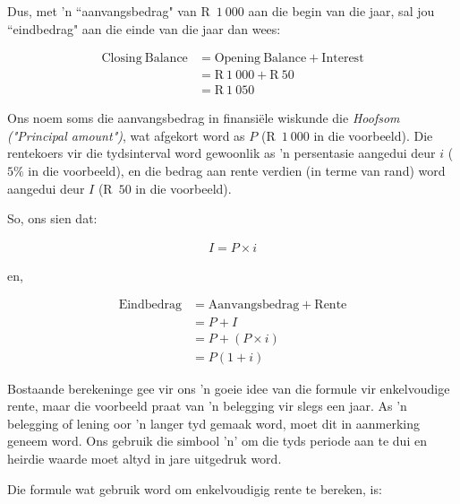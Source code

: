 Dus, met ’n “aanvangsbedrag" van R~$1~000$ aan die begin van die jaar, sal jou “eindbedrag" aan die einde van die
jaar dan wees:\par 
\begin{align*}
    \mathrm{Closing~Balance} &= \mathrm{Opening~Balance + Interest}\\
    &= \text{R}~1~000 + \text{R}~50\\
    &= \text{R}~1~050
\end{align*}

Ons noem soms die aanvangsbedrag in finansiële wiskunde die \textsl{Hoofsom ("Principal amount")}, wat afgekort word as $P$ (R~$1~000$ in die voorbeeld). Die rentekoers vir die tydsinterval word gewoonlik as ’n persentasie aangedui deur $i$ ($5\%$ in die voorbeeld),  en die bedrag aan rente verdien (in terme van rand) word aangedui deur $I$ (R~$50$ in die voorbeeld).\par 

So, ons sien dat:
        
\begin{align}
    I = P \times i
\end{align}

en,

\begin{align}
    \mathrm{Eindbedrag} &= \mathrm{Aanvangsbedrag + Rente} \nonumber\\
    &= P + I \nonumber\\
    &= P + (P \times i)\nonumber\\
    &= P(1 + i)
\end{align}



Bostaande berekeninge gee vir ons 'n goeie idee van die formule vir enkelvoudige rente, maar die voorbeeld praat van 'n belegging vir slegs een jaar. As 'n belegging of lening oor 'n langer tyd gemaak word, moet dit in aanmerking geneem word. Ons gebruik die simbool 'n' om die tyds periode aan te dui en heirdie waarde moet altyd in jare uitgedruk word.\par

Die formule wat gebruik word om enkelvoudigig rente te bereken, is:





